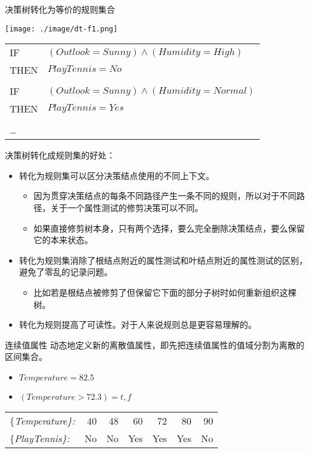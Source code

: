 \documentclass[presentation]{beamer}
\begin{document}
\begin{frame}[label={sec:org6870142}]{决策树转化为等价的规则集合}
\begin{center}
\texttt{[image: ./image/dt-f1.png]}
\end{center}

\begin{center}
\begin{tabular}{ll}
IF & \((Outlook=Sunny) \land (Humidity=High)\)\\[0pt]
THEN & \(PlayTennis=No\)\\[0pt]
 & \\[0pt]
IF & \((Outlook=Sunny) \land (Humidity=Normal)\)\\[0pt]
THEN & \(PlayTennis=Yes\)\\[0pt]
 & \\[0pt]
\ldots & \\[0pt]
\end{tabular}
\end{center}
\end{frame}

\begin{frame}[label={sec:orga760a70}]{决策树转化成规则集的好处：}
\begin{itemize}
\item 转化为规则集可以区分决策结点使用的不同上下文。
\begin{itemize}
\item 因为贯穿决策结点的每条不同路径产生一条不同的规则，所以对于不同路径，关于一个属性测试的修剪决策可以不同。
\item 如果直接修剪树本身，只有两个选择，要么完全删除决策结点，要么保留它的本来状态。
\end{itemize}
\item 转化为规则集消除了根结点附近的属性测试和叶结点附近的属性测试的区别，避免了零乱的记录问题。
\begin{itemize}
\item 比如若是根结点被修剪了但保留它下面的部分子树时如何重新组织这棵树。
\end{itemize}
\item 转化为规则提高了可读性。对于人来说规则总是更容易理解的。
\end{itemize}
\end{frame}

\begin{frame}[label={sec:orgd1a3f0c}]{连续值属性}
动态地定义新的离散值属性，即先把连续值属性的值域分割为离散的区间集合。
\begin{itemize}
\item \(Temperature = 82.5\)
\item \((Temperature>72.3) = t,f\)
\end{itemize}

\begin{center}
\begin{tabular}{lrrrrrr}
\{\em Temperature\}: & 40 & 48 & 60 & 72 & 80 & 90\\[0pt]
\{\em PlayTennis\}: & No & No & Yes & Yes & Yes & No\\[0pt]
\end{tabular}
\end{center}
\end{frame}
\end{document}
